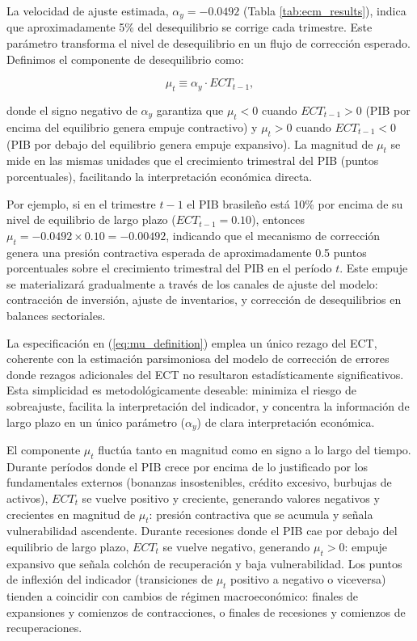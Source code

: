 \documentclass[3p,11pt,draft,natbib=false]{elsarticle}
\begin{document}
La velocidad de ajuste estimada, $\alpha_y = -0.0492$ (Tabla \ref{tab:ecm_results}), indica que aproximadamente 5\% del desequilibrio se corrige cada trimestre. Este parámetro transforma el nivel de desequilibrio en un flujo de corrección esperado. Definimos el componente de desequilibrio como:

\begin{equation}
\mu_t \equiv \alpha_y \cdot ECT_{t-1},
\label{eq:mu_definition}
\end{equation}

donde el signo negativo de $\alpha_y$ garantiza que $\mu_t < 0$ cuando $ECT_{t-1} > 0$ (PIB por encima del equilibrio genera empuje contractivo) y $\mu_t > 0$ cuando $ECT_{t-1} < 0$ (PIB por debajo del equilibrio genera empuje expansivo). La magnitud de $\mu_t$ se mide en las mismas unidades que el crecimiento trimestral del PIB (puntos porcentuales), facilitando la interpretación económica directa.

Por ejemplo, si en el trimestre $t-1$ el PIB brasileño está 10\% por encima de su nivel de equilibrio de largo plazo ($ECT_{t-1} = 0.10$), entonces $\mu_t = -0.0492 \times 0.10 = -0.00492$, indicando que el mecanismo de corrección genera una presión contractiva esperada de aproximadamente 0.5 puntos porcentuales sobre el crecimiento trimestral del PIB en el período $t$. Este empuje se materializará gradualmente a través de los canales de ajuste del modelo: contracción de inversión, ajuste de inventarios, y corrección de desequilibrios en balances sectoriales.

La especificación en (\ref{eq:mu_definition}) emplea un único rezago del ECT, coherente con la estimación parsimoniosa del modelo de corrección de errores donde rezagos adicionales del ECT no resultaron estadísticamente significativos. Esta simplicidad es metodológicamente deseable: minimiza el riesgo de sobreajuste, facilita la interpretación del indicador, y concentra la información de largo plazo en un único parámetro ($\alpha_y$) de clara interpretación económica.

El componente $\mu_t$ fluctúa tanto en magnitud como en signo a lo largo del tiempo. Durante períodos donde el PIB crece por encima de lo justificado por los fundamentales externos (bonanzas insostenibles, crédito excesivo, burbujas de activos), $ECT_t$ se vuelve positivo y creciente, generando valores negativos y crecientes en magnitud de $\mu_t$: presión contractiva que se acumula y señala vulnerabilidad ascendente. Durante recesiones donde el PIB cae por debajo del equilibrio de largo plazo, $ECT_t$ se vuelve negativo, generando $\mu_t > 0$: empuje expansivo que señala colchón de recuperación y baja vulnerabilidad. Los puntos de inflexión del indicador (transiciones de $\mu_t$ positivo a negativo o viceversa) tienden a coincidir con cambios de régimen macroeconómico: finales de expansiones y comienzos de contracciones, o finales de recesiones y comienzos de recuperaciones.
\end{document}
